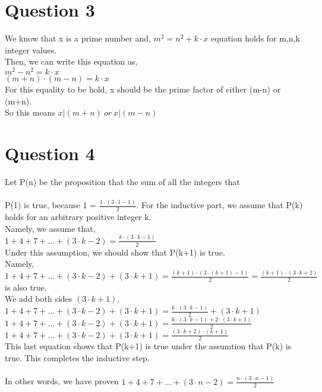\documentclass[12pt]{article}
\begin{document}
\section*{Question 3}
We know that x is a prime number and, $m^2=n^2+k\cdot x$ equation holds for m,n,k integer values.\\
Then, we can write this equation as,\\
$m^2-n^2=k\cdot x$\\
$(m+n)\cdot(m-n)=k\cdot x$\\
For this equality to be hold, x should be the prime factor of either (m-n) or (m+n).\\
So this means $x|(m+n)\:or\:x|(m-n)$

\section*{Question 4}
Let P(n) be the proposition that the sum of all the integers that \\\\
P(1) is true, because 1 = $\frac{1\cdot(3\cdot1-1)}{2}$. 
For the inductive part, we assume that P(k) holds for an arbitrary positive integer k.\\
Namely, we assume that,\\
$1+4+7+...+(3\cdot k-2) = \frac{k\cdot(3\cdot k-1)}{2}$\\
Under this assumption, we should show that P(k+1) is true.\\
Namely,\\
$1+4+7+...+(3\cdot k-2)+(3\cdot k+1) = \frac{(k+1)\cdot(3\cdot(k+1)-1)}{2} = \frac{(k+1)\cdot(3\cdot k+2)}{2}$\\
is also true.\\
We add both sides $(3\cdot k+1)$.\\
$1+4+7+...+(3\cdot k-2)+(3\cdot k+1) =\frac{k\cdot(3\cdot k-1)}{2}+(3\cdot k+1)$\\
$1+4+7+...+(3\cdot k-2)+(3\cdot k+1) =\frac{k\cdot(3\cdot k-1)+2\cdot(3\cdot k+1)}{2}$\\
$1+4+7+...+(3\cdot k-2)+(3\cdot k+1) =\frac{(3\cdot k+2)\cdot(k+1)}{2}$\\
This last equation shows that P(k+1) is true under the assumtion that P(k) is true. This completes the inductive step.\\\\
In other words, we have proven $1+4+7+...+(3\cdot n-2) = \frac{n\cdot(3\cdot n-1)}{2}$
\end{document}
